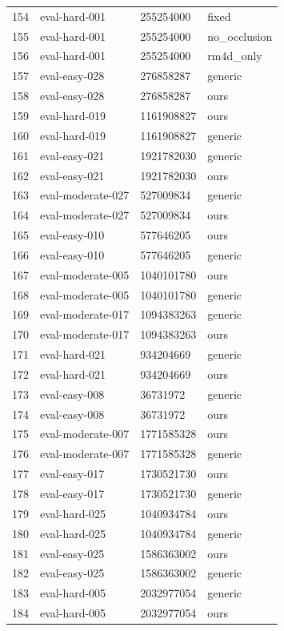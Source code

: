 \begin{tabular}{llll}
154 & eval-hard-001 & 255254000 & fixed \\
155 & eval-hard-001 & 255254000 & no\_occlusion \\
156 & eval-hard-001 & 255254000 & rm4d\_only \\
157 & eval-easy-028 & 276858287 & generic \\
158 & eval-easy-028 & 276858287 & ours \\
159 & eval-hard-019 & 1161908827 & ours \\
160 & eval-hard-019 & 1161908827 & generic \\
161 & eval-easy-021 & 1921782030 & generic \\
162 & eval-easy-021 & 1921782030 & ours \\
163 & eval-moderate-027 & 527009834 & generic \\
164 & eval-moderate-027 & 527009834 & ours \\
165 & eval-easy-010 & 577646205 & ours \\
166 & eval-easy-010 & 577646205 & generic \\
167 & eval-moderate-005 & 1040101780 & ours \\
168 & eval-moderate-005 & 1040101780 & generic \\
169 & eval-moderate-017 & 1094383263 & generic \\
170 & eval-moderate-017 & 1094383263 & ours \\
171 & eval-hard-021 & 934204669 & generic \\
172 & eval-hard-021 & 934204669 & ours \\
173 & eval-easy-008 & 36731972 & generic \\
174 & eval-easy-008 & 36731972 & ours \\
175 & eval-moderate-007 & 1771585328 & ours \\
176 & eval-moderate-007 & 1771585328 & generic \\
177 & eval-easy-017 & 1730521730 & ours \\
178 & eval-easy-017 & 1730521730 & generic \\
179 & eval-hard-025 & 1040934784 & ours \\
180 & eval-hard-025 & 1040934784 & generic \\
181 & eval-easy-025 & 1586363002 & ours \\
182 & eval-easy-025 & 1586363002 & generic \\
183 & eval-hard-005 & 2032977054 & generic \\
184 & eval-hard-005 & 2032977054 & ours \\

\end{tabular}
